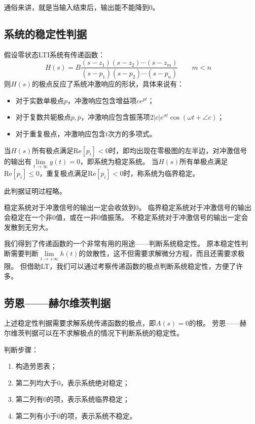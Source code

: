 通俗来讲，就是当输入结束后，输出能不能降到0。

\subsection{系统的稳定性判据}

\begin{theorem}[LTI系统的稳定性判据]
假设零状态LTI系统有传递函数：
\[
H\left( s \right) =B\frac{\left( s-z_1 \right) \left( s-z_2 \right) \cdots \left( s-z_m \right)}{\left( s-p_1 \right) \left( s-p_2 \right) \cdots \left( s-p_n \right)} \qquad m<n
\]
则$H\left( s \right) $的极点反应了系统冲激响应的形状，具体来说有：
\begin{itemize}
    \item 对于实数单极点$p$，冲激响应包含增益项$ce^{pt}$；
    \item 对于复数共轭极点$p,\bar{p}$，冲激响应包含振荡项$2\left| c \right|e^{\sigma t}\cos \left( \omega t+\angle c \right) $；
    \item 对于重复极点，冲激响应包含$t$次方的多项式。
\end{itemize}
当$H\left( s \right) $所有极点满足$\mathrm{Re}\left[ p_i \right] <0$时，即均出现在零极图的左半边，对冲激信号的输出有$\underset{t\rightarrow \infty}\lim y\left( t \right) =0$，即系统为稳定系统。
当$H\left( s \right) $所有单极点满足$\mathrm{Re}\left[ p_i \right] \leqslant 0$，重复极点满足$\mathrm{Re}\left[ p_i \right] <0$时，称系统为临界稳定。
\end{theorem}

此判据证明过程略。

稳定系统对于冲激信号的输出一定会收敛到0。
临界稳定系统对于冲激信号的输出会稳定在一个非0值，或在一非0值振荡。
不稳定系统对于冲激信号的输出一定会发散到无穷大。

我们得到了传递函数的一个非常有用的用途——判断系统稳定性。
原本稳定性判断需要判断$\underset{t\rightarrow +\infty}\lim h\left( t \right) $的敛散性，这不但需要求解微分方程，而且还需要求极限。
但借助LT，我们可以通过考察传递函数的极点判断系统稳定性，方便了许多。

\subsection{劳恩——赫尔维茨判据}

上述稳定性判据需要求解系统传递函数的极点，即$A\left( s \right) =0$的根。
劳恩——赫尔维茨判据可以在不求解极点的情况下判断系统的稳定性。

判断步骤：
\begin{enumerate}
    \item 构造劳恩表；
    \item 第二列均大于0，表示系统绝对稳定；
    \item 第二列有0的项，表示系统临界稳定；
    \item 第二列有小于0的项，表示系统不稳定。
\end{enumerate}




